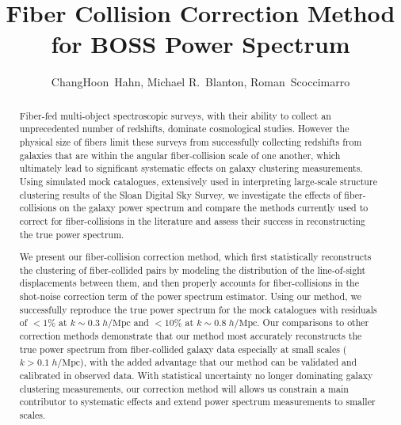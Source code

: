 \documentclass{emulateapj}
\begin{document}
\title{Fiber Collision Correction Method for BOSS Power Spectrum} 

\author{ChangHoon~Hahn, 
Michael R.~Blanton, 
Roman~Scoccimarro} 

\begin{abstract}
Fiber-fed multi-object spectroscopic surveys, with their ability to collect an unprecedented number of redshifts, dominate cosmological studies. However the physical size of fibers limit these surveys from successfully collecting redshifts from galaxies that are within the angular fiber-collision scale of one another, which ultimately lead to significant systematic effects on galaxy clustering measurements. Using simulated mock catalogues, extensively used in interpreting large-scale structure clustering results of the Sloan Digital Sky Survey, we investigate the effects of fiber-collisions on the galaxy power spectrum and compare the methods currently used to correct for fiber-collisions in the literature and assess their success in reconstructing the true power spectrum. 

We present our fiber-collision correction method, which first statistically reconstructs the clustering of fiber-collided pairs by modeling the distribution of the line-of-sight displacements between them, and then properly accounts for fiber-collisions in the shot-noise correction term of the power spectrum estimator. Using our method, we successfully reproduce the true power spectrum for the mock catalogues with residuals of $< 1\%$ at $k \sim 0.3 \; h/\mathrm{Mpc}$ and $< 10\%$ at $k \sim 0.8 \; h/\mathrm{Mpc}$. Our comparisons to other correction methods demonstrate that our method most accurately reconstructs the true power spectrum from fiber-collided galaxy data especially at small scales ($k > 0.1\; h/\mathrm{Mpc}$), with the added advantage that our method can be validated and calibrated in observed data. With statistical uncertainty no longer dominating galaxy clustering measurements, our correction method will allows us constrain a main contributor to systematic effects and extend power spectrum measurements to smaller scales. 
\end{abstract}
\end{document}
